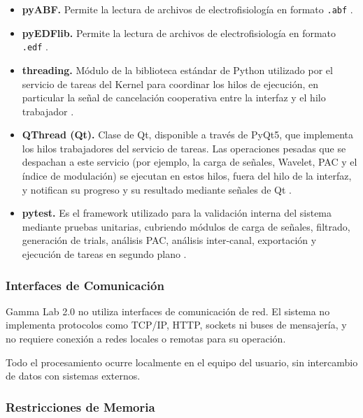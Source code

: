 \documentclass[12pt, letterpaper]{article}
\begin{document}
\begin{itemize}
    \item \textbf{pyABF.} Permite la lectura de archivos de
    electrofisiología en formato \texttt{.abf} \cite{ref9}.

    \item \textbf{pyEDFlib.} Permite la lectura de archivos de
    electrofisiología en formato \texttt{.edf} \cite{ref10}.

    \item \textbf{threading.} Módulo de la biblioteca estándar de Python
    utilizado por el servicio de tareas del Kernel para coordinar los hilos de
    ejecución, en particular la señal de cancelación cooperativa entre la
    interfaz y el hilo trabajador \cite{ref11}.

    \item \textbf{QThread (Qt).} Clase de Qt, disponible a través de PyQt5,
    que implementa los hilos trabajadores del servicio de tareas. Las
    operaciones pesadas que se despachan a este servicio (por ejemplo, la
    carga de señales, Wavelet, PAC y el índice de modulación) se ejecutan en
    estos hilos, fuera del hilo de la interfaz, y notifican su progreso y su
    resultado mediante señales de Qt \cite{ref12}.

    \item \textbf{pytest.} Es el framework utilizado para la validación
    interna del sistema mediante pruebas unitarias, cubriendo módulos de
    carga de señales, filtrado, generación de trials, análisis PAC,
    análisis inter-canal, exportación y ejecución de tareas en segundo plano \cite{ref13}.

\end{itemize}

\subsubsection{Interfaces de Comunicación}

Gamma Lab 2.0 no utiliza interfaces de comunicación de red. El sistema no
implementa protocolos como TCP/IP, HTTP, sockets ni buses de mensajería, y no
requiere conexión a redes locales o remotas para su operación.

Todo el procesamiento ocurre localmente en el equipo del usuario, sin
intercambio de datos con sistemas externos.

\subsubsection{Restricciones de Memoria}
\end{document}
